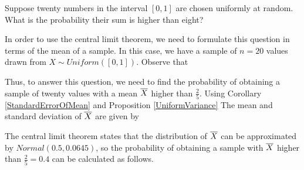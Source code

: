 \begin{examp}\label{CLTExamp}Suppose twenty numbers in the interval $[0,1]$ are chosen uniformly at random. What is the probability their sum is higher than eight?
\par
\noindent In order to use the central limit theorem, we need to formulate this question in terms of the mean of a sample. In this case, we have a sample of $n=20$ values drawn from $X \sim Uniform([0,1])$. Observe that
\par
\noindent Thus, to answer this question, we need to find the probability of obtaining a sample of twenty values with a mean ${\overline{X}}$ higher than $\frac{2}{5}$. Using Corollary \ref{StandardErrorOfMean} and Proposition \ref{UniformVariance} The mean and standard deviation of ${\overline{X}}$ are given by
\par
\noindent The central limit theorem states that the distribution of ${\overline{X}}$ can be approximated by $Normal(0.5, 0.0645)$, so the probability of obtaining a sample with ${\overline{X}}$ higher than $\frac{2}{5} = 0.4$ can be calculated as follows.



\end{examp}
